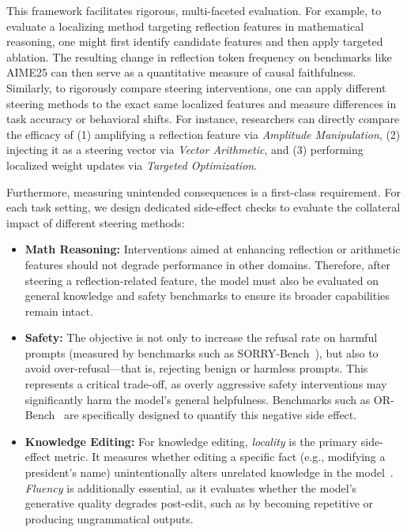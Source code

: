 \documentclass[11pt,letterpaper]{mystyle}
\begin{document}
This framework facilitates rigorous, multi-faceted evaluation. For example, to evaluate a localizing method targeting reflection features in mathematical reasoning, one might first identify candidate features and then apply targeted ablation. The resulting change in reflection token frequency on benchmarks like AIME25 can then serve as a quantitative measure of causal faithfulness. Similarly, to rigorously compare steering interventions, one can apply different steering methods to the exact same localized features and measure differences in task accuracy or behavioral shifts. For instance, researchers can directly compare the efficacy of (1) amplifying a reflection feature via \textit{Amplitude Manipulation}, (2) injecting it as a steering vector via \textit{Vector Arithmetic}, and (3) performing localized weight updates via \textit{Targeted Optimization}.

Furthermore, measuring unintended consequences is a first-class requirement. For each task setting, we design dedicated side-effect checks to evaluate the collateral impact of different steering methods:

\begin{itemize}[leftmargin=*]
\item \textbf{Math Reasoning:} Interventions aimed at enhancing reflection or arithmetic features should not degrade performance in other domains. Therefore, after steering a reflection-related feature, the model must also be evaluated on general knowledge and safety benchmarks to ensure its broader capabilities remain intact.
\item \textbf{Safety:} The objective is not only to increase the refusal rate on harmful prompts (measured by benchmarks such as SORRY-Bench~\citep{Xie2025}), but also to avoid over-refusal---that is, rejecting benign or harmless prompts. This represents a critical trade-off, as overly aggressive safety interventions may significantly harm the model's general helpfulness. Benchmarks such as OR-Bench~\citep{Cui2024} are specifically designed to quantify this negative side effect.
\item \textbf{Knowledge Editing:} For knowledge editing, \textit{locality} is the primary side-effect metric. It measures whether editing a specific fact (e.g., modifying a president's name) unintentionally alters unrelated knowledge in the model~\citep{Zhang2024knowledgeedit}. \textit{Fluency} is additionally essential, as it evaluates whether the model's generative quality degrades post-edit, such as by becoming repetitive or producing ungrammatical outputs.
\end{itemize}
\end{document}
